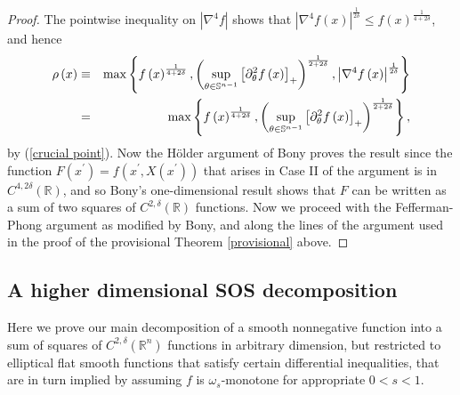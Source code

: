 \documentclass{amsart}
\theoremstyle{plain}
\numberwithin{equation}{section}
\begin{document}
\begin{proof}
The pointwise inequality on $\left\vert \nabla ^{4}f\right\vert $ shows that 
$\left\vert \nabla ^{4}f\left( x\right) \right\vert ^{\frac{1}{2\delta }%
}\leq f\left( x\right) ^{\frac{1}{4+2\delta }}$, and hence 
\begin{eqnarray*}
\rho \left( x\right)  &\equiv &\max \left\{ f\left( x\right) ^{\frac{1}{%
4+2\delta }},\left( \sup_{\theta \in \mathbb{S}^{n-1}}\left[ \partial
_{\theta }^{2}f\left( x\right) \right] _{+}\right) ^{\frac{1}{2+2\delta }%
},\left\vert \nabla ^{4}f\left( x\right) \right\vert ^{\frac{1}{2\delta }%
}\right\}  \\
&=&\max \left\{ f\left( x\right) ^{\frac{1}{4+2\delta }},\left( \sup_{\theta
\in \mathbb{S}^{n-1}}\left[ \partial _{\theta }^{2}f\left( x\right) \right]
_{+}\right) ^{\frac{1}{2+2\delta }}\right\} ,
\end{eqnarray*}%
by (\ref{crucial point}). Now the H\"{o}lder argument of Bony \cite[%
Subsection 5.1]{Bon} proves the result since the function $F\left( x^{\prime
}\right) =f\left( x^{\prime },X\left( x^{\prime }\right) \right) $ that
arises in Case II of the argument is in $C^{4,2\delta }\left( \mathbb{R}%
\right) $, and so Bony's one-dimensional result shows that $F$ can be
written as a sum of two squares of $C^{2,\delta }\left( \mathbb{R}\right) $
functions. Now we proceed with the Fefferman-Phong argument as modified by
Bony, and along the lines of the argument used in the proof of the
provisional Theorem \ref{provisional} above.
\end{proof}

\subsection{A higher dimensional SOS decomposition}

Here we prove our main decomposition of a smooth nonnegative function into a
sum of squares of $C^{2,\delta }\left( \mathbb{R}^{n}\right) $ functions in
arbitrary dimension, but restricted to elliptical flat smooth functions that
satisfy certain differential inequalities, that are in turn implied by
assuming $f$ is $\omega _{s}$-monotone for appropriate $0<s<1$.
\end{document}
